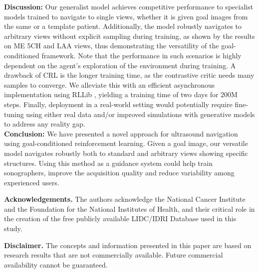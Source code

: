\textbf{Discussion:} Our generalist model achieves competitive performance to specialist models trained to navigate to single views, whether it is given goal images from the same or a template patient. Additionally, the model robustly navigates to arbitrary views without explicit sampling during training, as shown by the results on ME 5CH and LAA views, thus demonstrating the versatility of the goal-conditioned framework. Note that the performance in such scenarios is highly dependent on the agent's exploration of the environment during training. A drawback of CRL is the longer training time, as the contrastive critic needs many samples to converge. We alleviate this with an efficient asynchronous implementation using RLLib \cite{ray2017}, yielding a training time of two days for 200M steps. Finally, deployment in a real-world setting would potentially require fine-tuning using either real data and/or improved simulations with generative models to address any reality gap.\\
\textbf{Conclusion:} We have presented a novel approach for ultrasound navigation using goal-conditioned reinforcement learning. Given a goal image, our versatile model navigates robustly both to standard and arbitrary views showing specific structures. Using this method as a guidance system could help train sonographers, improve the acquisition quality and reduce variability among experienced users.


\noindent \textbf{Acknowledgements.} The authors acknowledge the National Cancer Institute and the Foundation for the National Institutes of Health, and their critical role in the creation of the free publicly available LIDC/IDRI Database used in this study.

\noindent \textbf{Disclaimer.} The concepts and information presented in this paper are based on research results that are not commercially available. Future commercial availability cannot be guaranteed.\\

\newpage



